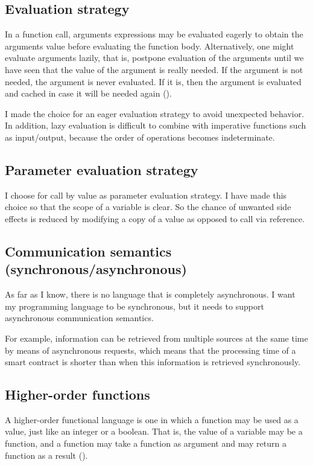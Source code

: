 \documentclass{uva-inf-article}
\begin{document}
\subsection{Evaluation strategy}
\par In a function call, arguments expressions may be evaluated eagerly 
to obtain the arguments value before evaluating the function body.
Alternatively, one might evaluate arguments lazily, that is, postpone evaluation 
of the arguments until we have seen that the value of the argument is really needed.
If the argument is not needed, the argument is never evaluated. If it is, 
then the argument is evaluated and cached in case it will be needed again
(\cite{Sestoft2012-2}).

I made the choice for an eager evaluation strategy to avoid unexpected behavior.
In addition, lazy evaluation is difficult to combine with imperative functions such as 
input/output, because the order of operations becomes indeterminate.

\subsection{Parameter evaluation strategy}
I choose for call by value as parameter evaluation strategy. 
I have made this choice so that the scope of a variable is clear. 
So the chance of unwanted side effects is reduced by modifying a copy of a value as opposed to call via reference.

\subsection{Communication semantics (synchronous/asynchronous)}
As far as I know, there is no language that is completely asynchronous. 
I want my programming language to be synchronous, but it needs to support asynchronous communication semantics.

For example, information can be retrieved from multiple sources at the same time by means of asynchronous requests, 
which means that the processing time of a smart contract is shorter than when this information is retrieved synchronously.

\subsection{Higher-order functions}
\par A higher-order functional language is one in which a function may be used as a value, 
just like an integer or a boolean. That is, the value of a variable may be a function, 
and a function may take a function as argument and may return a function as a result
(\cite{Sestoft2012}).
\end{document}
